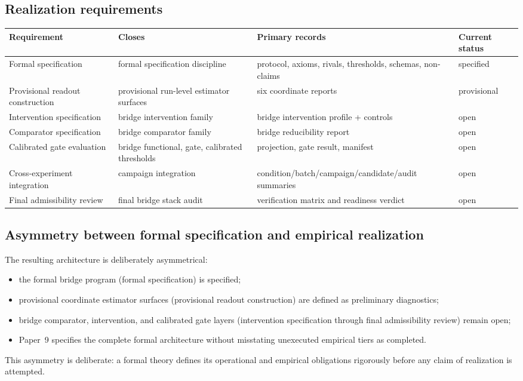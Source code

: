 \documentclass[11pt,a4paper]{article}
\theoremstyle{definition}
\begin{document}
\subsection{Realization requirements}
\begin{center}
\renewcommand{\arraystretch}{1.15}
\setlength{\tabcolsep}{4pt}
\begin{tabularx}{\linewidth}{@{}lY Y Y@{}}
\toprule
Requirement & Closes & Primary records & Current status \\
\midrule
Formal specification & formal specification discipline & protocol, axioms, rivals, thresholds, schemas, non-claims & specified \\
Provisional readout construction & provisional run-level estimator surfaces & six coordinate reports & provisional \\
Intervention specification & bridge intervention family & bridge intervention profile + controls & open \\
Comparator specification & bridge comparator family & bridge reducibility report & open \\
Calibrated gate evaluation & bridge functional, gate, calibrated thresholds & projection, gate result, manifest & open \\
Cross-experiment integration & campaign integration & condition/\allowbreak batch/\allowbreak campaign/\allowbreak candidate/\allowbreak audit summaries & open \\
Final admissibility review & final bridge stack audit & verification matrix and readiness verdict & open \\
\bottomrule
\end{tabularx}
\end{center}

\subsection{Asymmetry between formal specification and empirical realization}
The resulting architecture is deliberately asymmetrical:
\begin{itemize}[leftmargin=1.5em]
\item the formal bridge program (formal specification) is specified;
\item provisional coordinate estimator surfaces (provisional readout construction) are defined as preliminary diagnostics;
\item bridge comparator, intervention, and calibrated gate layers (intervention specification through final admissibility review) remain open;
\item Paper~9 specifies the complete formal architecture without misstating unexecuted empirical tiers as completed.
\end{itemize}
This asymmetry is deliberate: a formal theory defines its operational and empirical obligations rigorously before any claim of realization is attempted.
\end{document}
